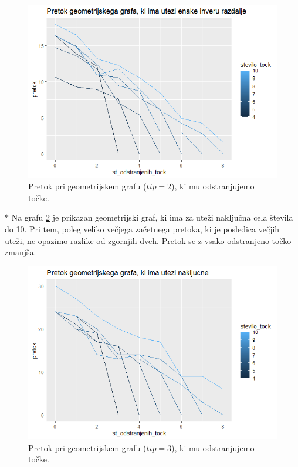 \documentclass[a4paper]{article}
\begin{document}
\begin{figure}[H]
\centerline{\includegraphics[scale=.5]{p6_2.PNG}}
\caption{Pretok pri geometrijskem grafu ($tip = 2$), ki mu odstranjujemo točke.}
\label{fig7}
\end{figure}

\newpage
$\ast$  Na grafu \ref{fig8} je prikazan geometrijski graf, ki ima za uteži naključna cela števila do 10. Pri tem, poleg veliko večjega začetnega pretoka, ki je posledica večjih uteži, ne opazimo razlike od zgornjih dveh. Pretok se z vsako odstranjeno točko zmanjša.

\begin{figure}[H]
\centerline{\includegraphics[scale=.5]{p6_3.PNG}}
\caption{Pretok pri geometrijskem grafu ($tip = 3$), ki mu odstranjujemo točke.}
\label{fig8}
\end{figure}
\end{document}
